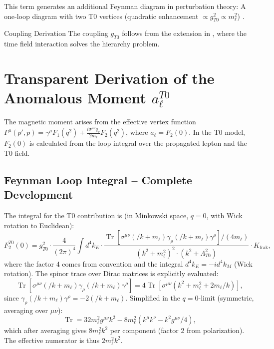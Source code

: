 \documentclass[12pt,a4paper]{article}
\begin{document}
	This term generates an additional Feynman diagram in perturbation theory: A one-loop diagram with two T0 vertices (quadratic enhancement $\propto g_{T0}^2 \propto m_\ell^2$) \cite{bell_myon}.
	
	\begin{derivation}{Coupling Derivation}
		The coupling $g_{T0}$ follows from the extension in \cite{QFT_T0}, where the time field interaction solves the hierarchy problem.
	\end{derivation}
	
	\section{Transparent Derivation of the Anomalous Moment $a_\ell^{T0}$}
	The magnetic moment arises from the effective vertex function $\Gamma^\mu(p',p) = \gamma^\mu F_1(q^2) + \frac{i \sigma^{\mu\nu} q_\nu}{2 m_\ell} F_2(q^2)$, where $a_\ell = F_2(0)$. In the T0 model, $F_2(0)$ is calculated from the loop integral over the propagated lepton and the T0 field.
	
	\subsection{Feynman Loop Integral -- Complete Development}
	The integral for the T0 contribution is (in Minkowski space, $q=0$, with Wick rotation to Euclidean):
	\begin{equation}
		F_2^{T0}(0) = g_{T0}^2 \cdot \frac{4}{(2\pi)^4} \int d^4k_E \cdot \frac{\operatorname{Tr} \left[ \sigma^{\mu\nu} (\slash{k} + m_\ell) \gamma_\rho (\slash{k} + m_\ell) \gamma^\rho \right] / (4 m_\ell)}{ (k^2 + m_\ell^2)^2 \cdot (k^2 + \Lambda_{T0}^2) } \cdot K_\text{frak},
	\end{equation}
	where the factor 4 comes from convention and the integral $d^4k_E = -i d^4k_M$ (Wick rotation). The spinor trace over Dirac matrices is explicitly evaluated:
	\begin{equation}
		\operatorname{Tr} \left[ \sigma^{\mu\nu} (\slash{k} + m_\ell) \gamma_\rho (\slash{k} + m_\ell) \gamma^\rho \right] = 4 \operatorname{Tr} \left[ \sigma^{\mu\nu} (k^2 + m_\ell^2 + 2 m_\ell \slash{k}) \right],
	\end{equation}
	since $\gamma_\rho (\slash{k} + m_\ell) \gamma^\rho = -2 (\slash{k} + m_\ell)$. Simplified in the $q=0$-limit (symmetric, averaging over $\mu\nu$):
	\begin{equation}
		\operatorname{Tr} = 32 m_\ell^2 g^{\mu\nu} k^2 - 8 m_\ell^2 (k^\mu k^\nu - k^2 g^{\mu\nu}/4),
	\end{equation}
	which after averaging gives $8 m_\ell^2 k^2$ per component (factor 2 from polarization). The effective numerator is thus $2 m_\ell^2 k^2$.
	
\end{document}
